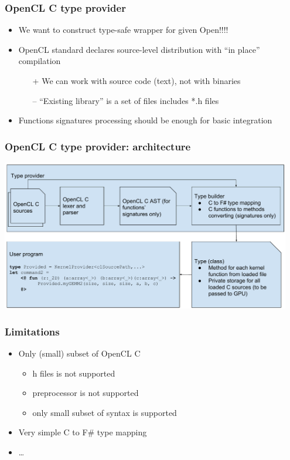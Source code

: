 \documentclass[xcolor=table]{beamer}
\begin{document}
\begin{frame}
  \transwipe[direction=90]
  \frametitle{OpenCL C type provider}
\begin{itemize}
\item We want to construct type-safe wrapper for given Open!!!!
\item OpenCL standard declares source-level distribution with ``in place'' compilation
\begin{itemize}
\item[+] We can work with source code (text), not with binaries
\item[--] ``Existing library'' is a set of files includes *.h files
\end{itemize}
\item Functions signatures processing should be enough for basic integration
\end{itemize}
\end{frame}
 
\begin{frame}
  \transwipe[direction=90]
  \frametitle{OpenCL C type provider: architecture}
    
  \includegraphics[width=0.95\textwidth]{pictures/OpenCL_C_TP.pdf}
  \\
  \pause
\end{frame}

\begin{frame}
  \transwipe[direction=90]
  \frametitle{Limitations}
\begin{itemize}
\item Only (small) subset of OpenCL C
 \begin{itemize}
 \item h files is not supported
 \item preprocessor is not supported
 \item only small subset of syntax is supported
  \end{itemize}
\item Very simple C to F\# type mapping
\item \dots
\end{itemize}

\end{frame}
\end{document}
